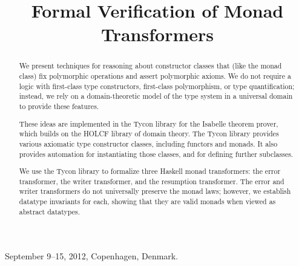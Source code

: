 \documentclass{sigplanconf}
\theoremstyle{definition}
\begin{document}
 {September 9--15, 2012, Copenhagen, Denmark.}


\title{Formal Verification of Monad Transformers}


\maketitle

\begin{abstract}
We present techniques for reasoning about constructor classes that (like the monad class) fix polymorphic operations and assert polymorphic axioms. We do not require a logic with first-class type constructors, first-class polymorphism, or type quantification; instead, we rely on a domain-theoretic model of the type system in a universal domain to provide these features.

These ideas are implemented in the Tycon library for the Isabelle theorem prover, which builds on the HOLCF library of domain theory. The Tycon library provides various axiomatic type constructor classes, including functors and monads. It also provides automation for instantiating those classes, and for defining further subclasses.

We use the Tycon library to formalize three Haskell monad transformers: the error transformer, the writer transformer, and the resumption transformer. The error and writer transformers do not universally preserve the monad laws; however, we establish datatype invariants for each, showing that they are valid monads when viewed as abstract datatypes.
\end{abstract}

\end{document}
